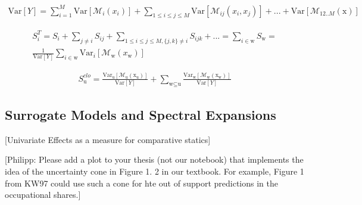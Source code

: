 \begin{align}
\text{Var}[Y] =  \sum_{i=1}^{M} \text{Var}[\mathcal{M}_i(x_i)] + \sum_{1 \leq i \leq j \leq M} \text{Var}[\mathcal{M}_{ij}(x_i,x_j)] + ... + \text{Var}[\mathcal{M}_{12..M}(\text{x})]
\end{align}

\begin{equation}
\begin{aligned}
S_i^T = S_i + \sum_{j \ne i} S_{ij} + \sum_{1 \leq i \leq j \leq M,\{j,k\} \ne i} S_{ijk} + ... = \sum_{i \in \text{w}} S_\text{w} = \\
\frac{1}{\text{Var}[Y]}\sum_{i \in \text{w}} \text{Var}_i[\mathcal{M}_\text{w}(x_\text{w})]
\end{aligned}
\end{equation}

\begin{align}
S_\text{u}^{clo} = \frac{\text{Var}_\text{u}[\mathcal{M}_\text{u}(\text{x}_\text{u})]}{\text{Var}[Y]} +  \sum_{\text{w} \subseteq \text{u}} \frac{\text{Var}_\text{w}[\mathcal{M}_\text{w}(\text{x}_\text{w})]}{\text{Var}[Y]}
\end{align}


\subsection{Surrogate Models and Spectral Expansions}


[Univariate Effects as a measure for comparative statics]

[Philipp: Please add a plot to your thesis (not our notebook) that implements the idea of the uncertainty cone in Figure 1. 2 in our textbook. For example, Figure 1 from KW97 could use such a cone for hte out of support predictions in the occupational shares.]

\newpage
